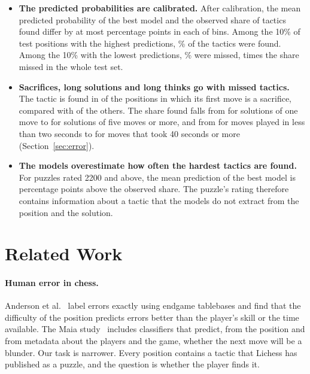 \documentclass[11pt]{article}
\begin{document}
\begin{itemize}
the training data
()\fi{}
are also accepted\ifchangeattacks, and an attack-aware attention bias is
not\fi{} (Section~\ref{sec:ablations}).\fi
\fi
\item \textbf{The predicted probabilities are calibrated.} After calibration,
the mean predicted probability of the best model and the observed share of
tactics found differ by at most  percentage
points in each of  bins\iflook. Among the 10\% of
test positions with the highest predictions, \% of the
tactics were found. Among the 10\% with the lowest predictions,
\% were missed,  times the
share missed in the whole test set\fi.
\iflook
\item \textbf{Sacrifices, long solutions and long thinks go with missed
tactics.} The tactic is found in  of the
positions in which its first move is a sacrifice, compared with
 of the others. The share found falls from
 for solutions of one move to
 for solutions of five moves or more, and from
 for moves played in less than two seconds to
 for moves that took 40 seconds or more
(Section~\ref{sec:error}).
\item \textbf{The models overestimate how often the hardest tactics are
found.} For puzzles rated 2200 and above, the mean prediction of the best
model is  percentage points
above the observed share. The puzzle's
rating therefore contains information about a tactic that the models do not
extract from the position and the solution.
\fi
\end{itemize}

\section{Related Work}
\label{sec:related}

\paragraph{Human error in chess.}
Anderson et al.~\cite{humanerror} label errors exactly using endgame
tablebases and find that the difficulty of the position predicts errors
better than the player's skill or the time available. The Maia
study~\cite{maia} includes classifiers that predict, from the position and
from metadata about the players and the game, whether the next move will be a
blunder. Our task is narrower. Every position contains a tactic that Lichess
has published as a puzzle, and the question is whether the player finds it.
\end{document}
